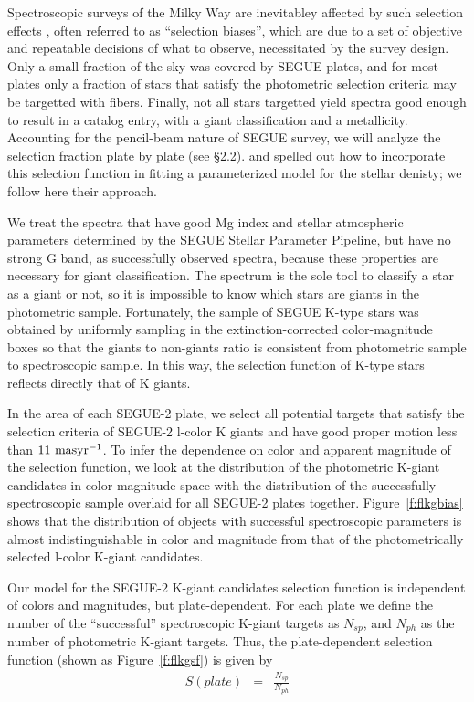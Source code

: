 \documentclass[12pt,preprint]{aastex}
\begin{document}
Spectroscopic surveys of the Milky Way are inevitabley  affected by such selection effects \citet{Rix2013}, often referred to as ``selection biases'', which are due to a set of objective and repeatable decisions of what to observe, necessitated by the survey design. Only a small fraction of the sky was covered by SEGUE plates, and for most plates only a fraction of stars that satisfy the photometric selection criteria may be targetted with fibers. Finally, not all stars targetted yield spectra good enough to result in a catalog entry, with a giant classification and a metallicity. Accounting for the pencil-beam nature of SEGUE survey, we will analyze the selection fraction plate by plate (see \S2.2). 
\citet{Bovy2012} and \citet{Rix2013} spelled out how to incorporate this selection function in fitting a parameterized model for the stellar denisty; we follow here their approach.  

 We treat the spectra that have good Mg index and stellar atmospheric parameters determined by the SEGUE Stellar Parameter Pipeline\citep[SSPP;][]{Lee2008a,Lee2008b,Lee2011}, but have no strong G band, as successfully observed spectra, because these properties are necessary for giant classification. The spectrum is the sole tool to classify a star as a giant or not, so it is impossible to know which stars are giants in the photometric sample. Fortunately, the sample of SEGUE K-type stars was obtained by uniformly sampling in the extinction-corrected color-magnitude boxes so that the giants to non-giants ratio is consistent from photometric sample to spectroscopic sample. In this way, the selection function of K-type stars reflects directly that of K giants.

In the area of each SEGUE-2 plate, we select all potential targets that satisfy the selection criteria of SEGUE-2 l-color K giants and have good proper motion less than $\rm 11~masyr^{-1}$. To infer the dependence on color and apparent magnitude of the selection function, we look at the distribution of the photometric K-giant candidates in color-magnitude space with the distribution of the successfully spectroscopic sample overlaid for all SEGUE-2 plates together. Figure~\ref{f:flkgbias} shows that the distribution of objects with successful spectroscopic parameters is almost indistinguishable in color and magnitude from that of the photometrically selected l-color K-giant candidates.

Our model for the SEGUE-2 K-giant candidates selection function is independent of colors and magnitudes, but plate-dependent. For each plate we define the number of the ``successful'' spectroscopic K-giant targets as $N_{sp}$, and $N_{ph}$ as the number of photometric K-giant targets. Thus, the plate-dependent selection function (shown as Figure~\ref{f:flkgsf}) is given by
\begin{eqnarray}
S(plate) &=& \frac{N_{sp}}{N_{ph}}   
 \end{eqnarray}
\end{document}
